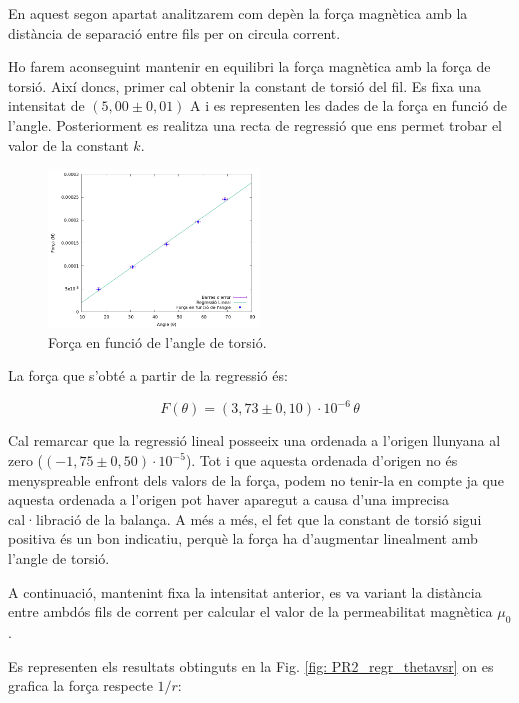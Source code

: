 \documentclass[11pt]{article}
\numberwithin{equation}{section}
\numberwithin{figure}{section}
\numberwithin{table}{section}
\begin{document}
En aquest segon apartat analitzarem com depèn la força magnètica amb la distància de separació entre fils per on circula corrent. 

Ho farem aconseguint mantenir en equilibri la força magnètica amb la força de torsió. Així doncs, primer cal obtenir la constant de torsió del fil. Es fixa una intensitat de $(5,00 ± 0,01)$ A i es representen les dades de la força en funció de l’angle. Posteriorment es realitza una recta de regressió que ens permet trobar el valor de la constant $k$.

\begin{figure}[H]
    \centering
    \includegraphics[width=0.5\textwidth]{PR2_regr_Fvstheta.png}
    \caption{Força en funció de l'angle de torsió.}
    \label{fig: PR2_regr_Fvstheta}
\end{figure}

La força que s’obté a partir de la regressió és:

\begin{equation}\label{F_ktheta}
    F(\theta) = (3,73 \pm 0,10) \cdot 10^{-6}\, \theta
\end{equation}

Cal remarcar que la regressió lineal posseeix una ordenada a l’origen llunyana al zero ($(-1,75 \pm 0,50)·10^{-5}$). Tot i que aquesta ordenada d’origen no és menyspreable enfront dels valors de la força, podem no tenir-la en compte ja que aquesta ordenada a l'origen pot haver aparegut a causa d’una imprecisa cal·libració de la balança. A més a més, el fet que la constant de torsió sigui positiva és un bon indicatiu, perquè la força ha d’augmentar linealment amb l’angle de torsió.

A continuació, mantenint fixa la intensitat anterior, es va variant la distància entre ambdós fils de corrent per calcular el valor de la permeabilitat magnètica $\mu_0$. 

Es representen els resultats obtinguts en la Fig. \ref{fig: PR2_regr_thetavsr} on es grafica la força respecte $1/r$:
\end{document}
